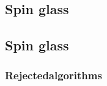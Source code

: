 

\subsection{Spin glass}
\label{sec:spinglass from introduction}
\subsection{Spin glass}
\label{sec:spinglass from introduction}
\subsubsection{Rejectedalgorithms}

